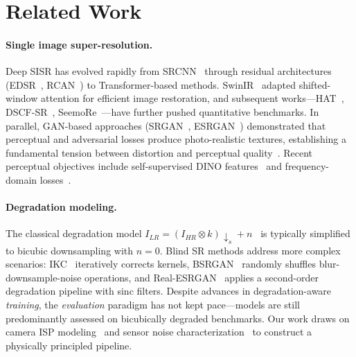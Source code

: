 \section{Related Work}
\label{sec:related}

\paragraph{Single image super-resolution.}
Deep SISR has evolved rapidly from SRCNN~\cite{dong2015image} through residual architectures (EDSR~\cite{lim2017enhanced}, RCAN~\cite{zhang2018image}) to Transformer-based methods.
SwinIR~\cite{liang2021swinir} adapted shifted-window attention for efficient image restoration, and subsequent works---HAT~\cite{chen2023hat}, DSCF-SR~\cite{xiao2024dscf}, SeemoRe~\cite{zamfir2024seemore}---have further pushed quantitative benchmarks.
In parallel, GAN-based approaches (SRGAN~\cite{ledig2017photo}, ESRGAN~\cite{wang2018esrgan}) demonstrated that perceptual and adversarial losses produce photo-realistic textures, establishing a fundamental tension between distortion and perceptual quality~\cite{blau2018perception}.
Recent perceptual objectives include self-supervised DINO features~\cite{caron2021emerging} and frequency-domain losses~\cite{fuoli2021fourier}.

\paragraph{Degradation modeling.}
The classical degradation model $I_{LR} = (I_{HR} \otimes k) \downarrow_s + n$~\cite{dong2015image} is typically simplified to bicubic downsampling with $n{=}0$.
Blind SR methods address more complex scenarios: IKC~\cite{gu2019blind} iteratively corrects kernels, BSRGAN~\cite{zhang2021designing} randomly shuffles blur-downsample-noise operations, and Real-ESRGAN~\cite{wang2021real} applies a second-order degradation pipeline with sinc filters.
Despite advances in degradation-aware \textit{training}, the \textit{evaluation} paradigm has not kept pace---models are still predominantly assessed on bicubically degraded benchmarks.
Our work draws on camera ISP modeling~\cite{zamir2020cycleisp} and sensor noise characterization~\cite{healey1994radiometric,foi2008practical} to construct a physically principled pipeline.


